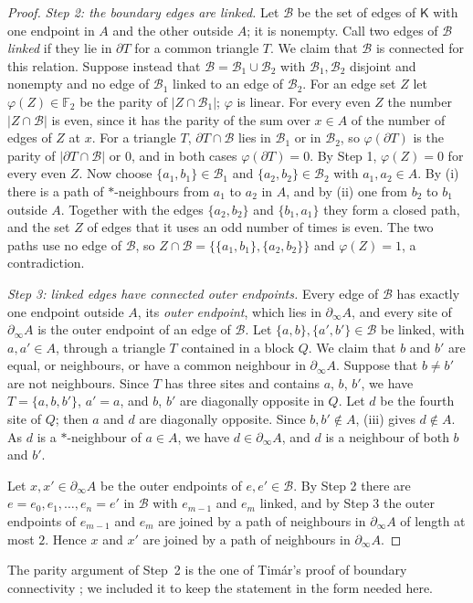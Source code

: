\begin{proof}
\emph{Step 2: the boundary edges are linked.} Let $\mathcal B$ be the set of edges of $\mathsf K$ with one endpoint in $A$ and the other outside $A$; it is nonempty. Call two edges of $\mathcal B$ \emph{linked} if they lie in $\partial T$ for a common triangle $T$. We claim that $\mathcal B$ is connected for this relation. Suppose instead that $\mathcal B = \mathcal B_1 \cup \mathcal B_2$ with $\mathcal B_1, \mathcal B_2$ disjoint and nonempty and no edge of $\mathcal B_1$ linked to an edge of $\mathcal B_2$. For an edge set $Z$ let $\varphi(Z) \in \mathbb F_2$ be the parity of $|Z \cap \mathcal B_1|$; $\varphi$ is linear. For every even $Z$ the number $|Z \cap \mathcal B|$ is even, since it has the parity of the sum over $x \in A$ of the number of edges of $Z$ at $x$. For a triangle $T$, $\partial T \cap \mathcal B$ lies in $\mathcal B_1$ or in $\mathcal B_2$, so $\varphi(\partial T)$ is the parity of $|\partial T \cap \mathcal B|$ or $0$, and in both cases $\varphi(\partial T) = 0$. By Step 1, $\varphi(Z) = 0$ for every even $Z$. Now choose $\{a_1, b_1\} \in \mathcal B_1$ and $\{a_2, b_2\} \in \mathcal B_2$ with $a_1, a_2 \in A$. By (i) there is a path of $*$-neighbours from $a_1$ to $a_2$ in $A$, and by (ii) one from $b_2$ to $b_1$ outside $A$. Together with the edges $\{a_2, b_2\}$ and $\{b_1, a_1\}$ they form a closed path, and the set $Z$ of edges that it uses an odd number of times is even. The two paths use no edge of $\mathcal B$, so $Z \cap \mathcal B = \{\{a_1, b_1\}, \{a_2, b_2\}\}$ and $\varphi(Z) = 1$, a contradiction.

\emph{Step 3: linked edges have connected outer endpoints.} Every edge of $\mathcal B$ has exactly one endpoint outside $A$, its \emph{outer endpoint}, which lies in $\partial_\infty A$, and every site of $\partial_\infty A$ is the outer endpoint of an edge of $\mathcal B$. Let $\{a, b\}, \{a', b'\} \in \mathcal B$ be linked, with $a, a' \in A$, through a triangle $T$ contained in a block $Q$. We claim that $b$ and $b'$ are equal, or neighbours, or have a common neighbour in $\partial_\infty A$. Suppose that $b \neq b'$ are not neighbours. Since $T$ has three sites and contains $a$, $b$, $b'$, we have $T = \{a, b, b'\}$, $a' = a$, and $b$, $b'$ are diagonally opposite in $Q$. Let $d$ be the fourth site of $Q$; then $a$ and $d$ are diagonally opposite. Since $b, b' \notin A$, (iii) gives $d \notin A$. As $d$ is a $*$-neighbour of $a \in A$, we have $d \in \partial_\infty A$, and $d$ is a neighbour of both $b$ and $b'$.

Let $x, x' \in \partial_\infty A$ be the outer endpoints of $e, e' \in \mathcal B$. By Step 2 there are $e = e_0, e_1, \dots, e_n = e'$ in $\mathcal B$ with $e_{m - 1}$ and $e_m$ linked, and by Step 3 the outer endpoints of $e_{m - 1}$ and $e_m$ are joined by a path of neighbours in $\partial_\infty A$ of length at most $2$. Hence $x$ and $x'$ are joined by a path of neighbours in $\partial_\infty A$.
\end{proof}

The parity argument of Step~2 is the one of Tim\'ar's proof of boundary connectivity \cite{Tim13}; we included it to keep the statement in the form needed here.
